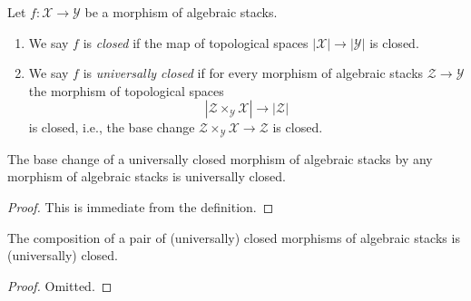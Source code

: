 \begin{definition}
\label{definition-closed}
Let $f : \mathcal{X} \to \mathcal{Y}$ be a morphism of algebraic stacks.
\begin{enumerate}
\item We say $f$ is {\it closed} if the map of topological
spaces $|\mathcal{X}| \to |\mathcal{Y}|$ is closed.
\item We say $f$ is {\it universally closed} if for every morphism
of algebraic stacks $\mathcal{Z} \to \mathcal{Y}$
the morphism of topological spaces
$$
|\mathcal{Z} \times_\mathcal{Y} \mathcal{X}| \to |\mathcal{Z}|
$$
is closed, i.e., the base change
$\mathcal{Z} \times_\mathcal{Y} \mathcal{X} \to \mathcal{Z}$ is closed.
\end{enumerate}
\end{definition}

\begin{lemma}
\label{lemma-base-change-universally-closed}
The base change of a universally closed morphism of algebraic stacks
by any morphism of algebraic stacks is universally closed.
\end{lemma}

\begin{proof}
This is immediate from the definition.
\end{proof}

\begin{lemma}
\label{lemma-composition-universally-closed}
The composition of a pair of (universally) closed morphisms of
algebraic stacks is (universally) closed.
\end{lemma}

\begin{proof}
Omitted.
\end{proof}




















